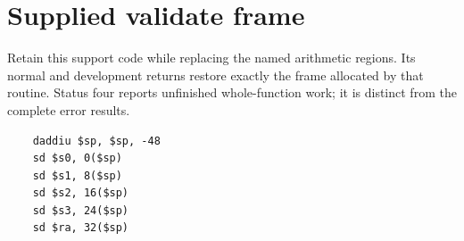 \section{Supplied validate frame}
Retain this support code while replacing the named arithmetic regions. Its normal and development returns restore exactly the frame allocated by that routine. Status four reports unfinished whole-function work; it is distinct from the complete error results.

\begin{verbatim}
    daddiu $sp, $sp, -48
    sd $s0, 0($sp)
    sd $s1, 8($sp)
    sd $s2, 16($sp)
    sd $s3, 24($sp)
    sd $ra, 32($sp)
\end{verbatim}
